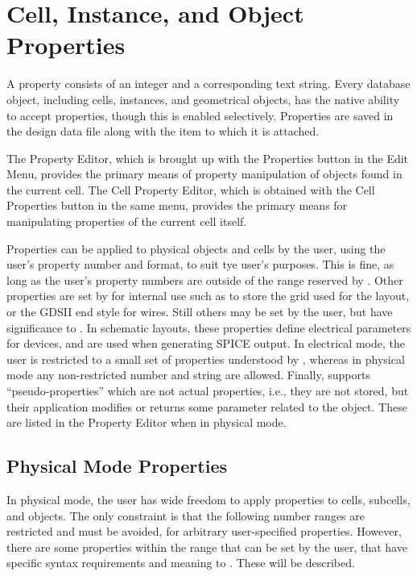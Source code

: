 \section{Cell, Instance, and Object Properties}

A property consists of an integer and a corresponding text string. 
Every database object, including cells, instances, and geometrical
objects, has the native ability to accept properties, though this is
enabled selectively.  Properties are saved in the design data file
along with the item to which it is attached.

The {\cb Property Editor}, which is brought up with the {\cb
Properties} button in the {\cb Edit Menu}, provides the primary means
of property manipulation of objects found in the current cell.  The
{\cb Cell Property Editor}, which is obtained with the {\cb Cell
Properties} button in the same menu, provides the primary means for
manipulating properties of the current cell itself.

Properties can be applied to physical objects and cells by the user,
using the user's property number and format, to suit tye user's
purposes.  This is fine, as long as the user's property numbers are
outside of the range reserved by {\Xic}.  Other properties are set by
{\Xic} for internal use such as to store the grid used for the layout,
or the GDSII end style for wires.  Still others may be set by the
user, but have significance to {\Xic}.  In schematic layouts, these
properties define electrical parameters for devices, and are used when
generating SPICE output.  In electrical mode, the user is restricted
to a small set of properties understood by {\Xic}, whereas in physical
mode any non-restricted number and string are allowed.  Finally,
{\Xic} supports ``pseudo-properties'' which are not actual properties,
i.e., they are not stored, but their application modifies or returns
some parameter related to the object.  These are listed in the {\cb
Property Editor} when in physical mode.


\subsection{Physical Mode Properties}

In physical mode, the user has wide freedom to apply properties to
cells, subcells, and objects.  The only constraint is that the
following number ranges are restricted and must be avoided, for
arbitrary user-specified properties.  However, there are some
properties within the range that can be set by the user, that have
specific syntax requirements and meaning to {\Xic}.  These will be
described.

